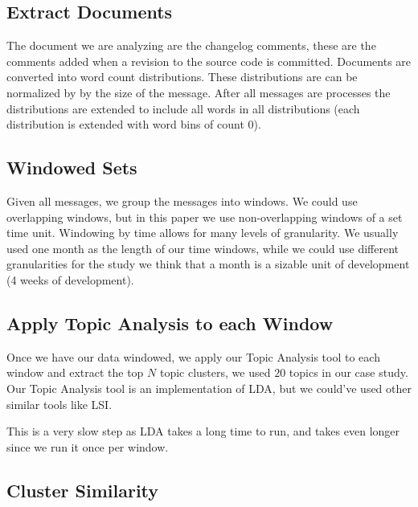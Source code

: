 \documentclass[times, 10pt,twocolumn]{article}
\begin{document}
\subsection{Extract Documents}

The document we are analyzing are the changelog comments, these are
the comments added when a revision to the source code is committed.
Documents are converted into word count distributions. These
distributions are can be normalized by by the size of the
message. After all messages are processes the distributions are
extended to include all words in all distributions (each distribution
is extended with word bins of count 0).

\subsection{Windowed Sets}

Given all messages, we group the messages into windows. We could use
overlapping windows, but in this paper we use non-overlapping windows
of a set time unit.  Windowing by time allows for many levels of
granularity. We usually used one month as the length of our time
windows, while we could use different granularities for the study we
think that a month is a sizable unit of development (4 weeks of
development).


\subsection{Apply Topic Analysis to each Window}

Once we have our data windowed, we apply our Topic Analysis tool to
each window and extract the top $N$ topic clusters, we used $20$
topics in our case study. Our Topic Analysis tool is an implementation
of LDA, but we could've used other similar tools like LSI.

This is a very slow step as LDA takes a long time to run, and takes
even longer since we run it once per window.





\subsection{Cluster Similarity}
\end{document}
